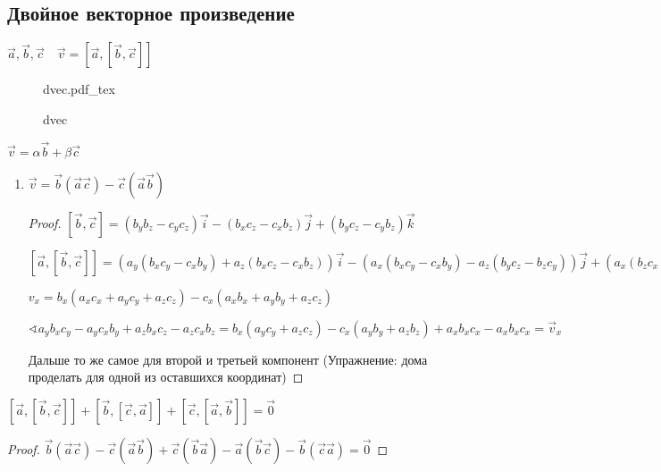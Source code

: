 \documentclass{book}
\theoremstyle{definition}
\newcommand{\incfig}[1]{%
    \def\svgwidth{\columnwidth}
    {#1.pdf_tex}
}
\begin{document}
\subsection{Двойное векторное произведение}

$\vec a, \vec b, \vec c\quad \vec v = \left[ \vec a, \left[ \vec b, \vec c \right]  \right] $

\begin{figure}[ht]
    \centering
    \incfig{dvec}
    \caption{dvec}
    \label{fig:dvec}
\end{figure}

$\vec v = \alpha \vec b + \beta \vec c$

 \begin{enumerate}
     \item $\vec v = \vec b\left( \vec a \vec c \right)  - \vec c(\vec a\vec b)$
         \begin{proof}
             $\left[ \vec b, \vec c \right]  = (b_yb_z-c_yc_z)\vec i - \left( b_xc_z - c_xb_z \right) \vec j + \left( b_yc_z-c_yb_z \right) \vec k$

             $[\vec a, [\vec b, \vec c] ]= \left(a_y(b_xc_y-c_xb_y) + a_z\left( b_xc_z-c_xb_z \right) \right)\vec i - \left( a_x\left( b_xc_y-c_xb_y \right) - a_z\left( b_yc_z - b_zc_y \right)  \right) \vec j + \left( a_x\left( b_zc_x - c_zb_x \right)  - a_y\left( b_yc_z - b_zc_y \right)  \right) \vec k$ 

             $v_x = b_x\left( a_xc_x+a_yc_y+a_zc_z \right)  - c_x\left( a_xb_x + a_yb_y+a_zc_z \right) $

             $\sphericalangle a_yb_xc_y-a_yc_xb_y + a_zb_xc_z - a_zc_xb_z = b_x(a_yc_y+a_zc_z)-c_x \left( a_yb_y+a_zb_z \right)  + a_xb_xc_x - a_xb_xc_x = \vec v_x$ 

             Дальше то же самое для второй и третьей компонент (Упражнение: дома проделать для одной из оставшихся координат)
         \end{proof}
\end{enumerate}


\begin{theorem}

    $\left[ \vec a, \left[ \vec b , \vec c \right]  \right] + \left[ \vec b , \left[ \vec c, \vec a \right]  \right] + \left[ \vec c, \left[ \vec a, \vec b \right]  \right] = \vec 0$
\end{theorem}
\begin{proof}
    $\vec b( \vec a\vec c)-\vec c(\vec a\vec b) + \vec c(\vec b\vec a)  - \vec a(\vec b \vec c) - \vec b(\vec c\vec a) = \vec 0$
\end{proof}
\end{document}
